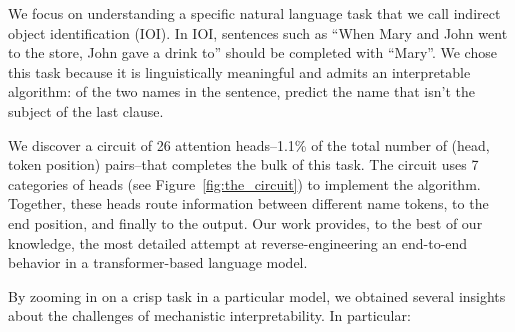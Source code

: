 
We focus on understanding a specific natural language task  %
that we call indirect object identification (IOI). In IOI, sentences such as ``When Mary and John went to the store, John gave a drink to'' should be completed with ``Mary''. %
 We chose this task because it is linguistically meaningful and admits an interpretable algorithm: of the two names in the sentence, predict the name that isn't the subject of the last clause. 

We discover a circuit of 26 attention heads--1.1\% of the total number of (head, token position) pairs--that completes the bulk of this task. 
The circuit uses 7 categories of heads (see Figure~\ref{fig:the_circuit}) to implement the algorithm. Together, these heads route information between different name tokens, to the end position, and finally to the output. 
Our work provides, to the best of our knowledge, the most detailed attempt at reverse-engineering an end-to-end behavior in a transformer-based language model. 

By zooming in on a crisp task in a particular model, we obtained several insights about the challenges of mechanistic interpretability. In particular:

